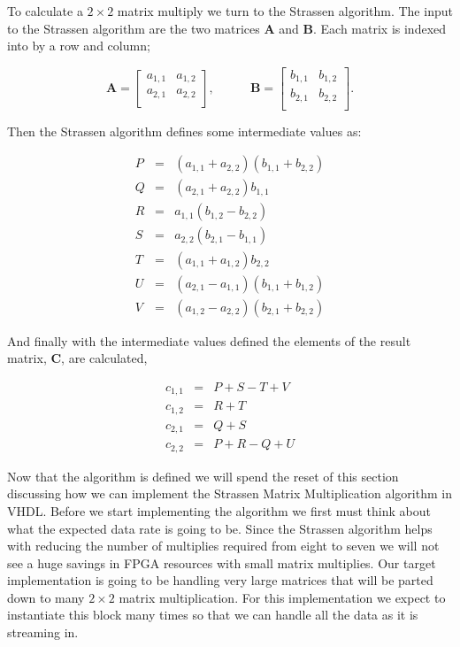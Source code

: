 To calculate a $2 \times 2$ matrix multiply we turn to the Strassen algorithm. The input to the Strassen algorithm are the two matrices $\mathbf{A}$ and $\mathbf{B}$. Each matrix is indexed into by a row and column;

\begin{equation}
\mathbf{A}=
\begin{bmatrix}
  a_{1,1} & a_{1,2} \\
  a_{2,1} & a_{2,2} \\
 \end{bmatrix},~~~~~~~~~~~~~
\mathbf{B}=
\begin{bmatrix}
  b_{1,1} & b_{1,2} \\
  b_{2,1} & b_{2,2} \\
 \end{bmatrix}.
\end{equation}

Then the Strassen algorithm defines some intermediate values as:

\begin{eqnarray}
\label{eq:capp}
P &=& (a_{1,1} + a_{2,2})(b_{1,1} + b_{2,2})\\
Q &=& (a_{2,1} + a_{2,2})b_{1,1}          \\
R &=& a_{1,1}(b_{1,2} - b_{2,2})\\
S &=& a_{2,2}(b_{2,1} - b_{1,1})\\
T &=& (a_{1,1} + a_{1,2})b_{2,2}  \\        
U &=& (a_{2,1} - a_{1,1})(b_{1,1} + b_{1,2})\\
V &=& (a_{1,2} - a_{2,2})(b_{2,1} + b_{2,2})
\label{eq:capv}
\end{eqnarray}

And finally with the intermediate values defined the elements of the result matrix, $\mathbf{C}$, are calculated,

\begin{eqnarray}
c_{1,1} &=& P + S - T + V\\
c_{1,2} &=& R + T\\
c_{2,1} &=& Q + S\\
c_{2,2} &=& P + R - Q + U
\label{eq:couts}
\end{eqnarray}

Now that the algorithm is defined we will spend the reset of this section discussing how we can implement the Strassen Matrix Multiplication algorithm in \ac{VHDL}. Before we start implementing the algorithm we first must think about what the expected data rate is going to be. Since the Strassen algorithm helps with reducing the number of multiplies required from eight to seven we will not see a huge savings in \ac{FPGA} resources with small matrix multiplies. Our target implementation is going to be handling very large matrices that will be parted down to many $2 \times 2$ matrix multiplication. For this implementation we expect to instantiate this block many times so that we can handle all the data as it is streaming in. 

